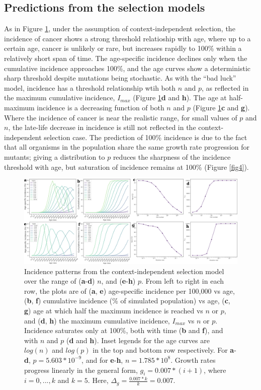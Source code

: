 \documentclass[12pt,onecolumn,twoside]{article}
\begin{document}
\subsection{Predictions from the selection models}
As in Figure \ref{fig3}, under the assumption of context-independent selection, the incidence of cancer shows a strong threshold relatioship with age, where up to a certain age, cancer is unlikely or rare, but increases rapidly to 100\% within a relatively short span of time. The age-specific incidence declines only when the cumulative incidence approaches 100\%, and the age curves show a deterministic sharp threshold despite mutations being stochastic. As with the ``bad luck'' model, incidence has a threshold relationship wtih both $n$ and $p$, as reflected in the maximum cumulative incidence, $I_{max}$ (Figure \ref{fig3}\textbf{d} and \textbf{h}). The age at half-maximum incidence is a decreasing function of both $n$ and $p$ (Figure \ref{fig3}\textbf{c} and \textbf{g}). Where the incidence of cancer is near the realistic range, for small values of $p$ and $n$, the late-life decrease in incidence is still not reflected in the context-independent selection case. The prediction of 100\% incidence is due to the fact that all organisms in the population share the same growth rate progression for mutants; giving a distribution to $p$ reduces the sharpness of the incidence threshold with age, but saturation of incidence remains at 100\% (Figure \ref{fig4}).

\begin{figure}[!ht]
	\centering
	\includegraphics[width=\linewidth]{fig3.png}
	\caption{Incidence patterns from the context-independent selection model over the range of (\textbf{a}-\textbf{d}) $n$, and (\textbf{e}-\textbf{h}) $p$. From left to right in each row, the plots are of (\textbf{a}, \textbf{e}) age-specific incidence per 100,000 vs age, (\textbf{b}, \textbf{f}) cumulative incidence (\% of simulated population) vs age, (\textbf{c}, \textbf{g}) age at which half the maximum incidence is reached vs $n$ or $p$, and (\textbf{d}, \textbf{h}) the maximum cumulative incidence, $I_{max}$ vs $n$ or $p$. Incidence saturates only at 100\%, both with time (\textbf{b} and \textbf{f}), and with $n$ and $p$ (\textbf{d} and \textbf{h}). Inset legends for the age curves are $log(n)$ and $log(p)$ in the top and bottom row respectively. For \textbf{a}-\textbf{d}, $p=5.603*10^{-9}$, and for \textbf{e}-\textbf{h}, $n=1.785*10^{8}$. Growth rates progress linearly in the general form, $g_{i}=0.007*(i+1)$, where $i=0,...,k$ and $k=5$. Here, $\Delta_{g}=\frac{0.007*k}{k}=0.007$.}
	\label{fig3}
\end{figure}
\end{document}
